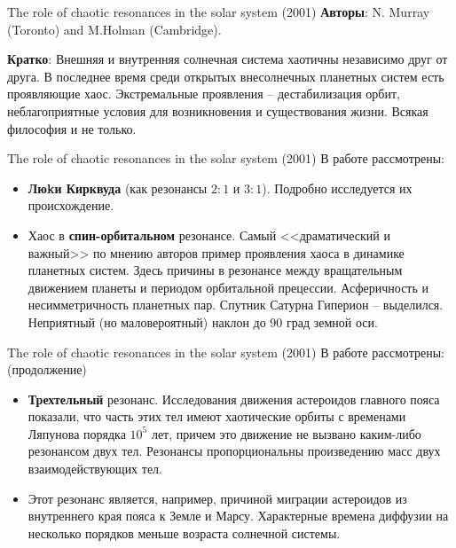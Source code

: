 \documentclass{beamer}
\begin{document}
\begin{frame}{The role of chaotic resonances in the solar system (2001)}
        \textbf{Авторы}: N. Murray (Toronto) and M.Holman (Cambridge).

        \textbf{Кратко}: Внешняя и внутренняя солнечная система хаотичны независимо друг от друга. В последнее время среди открытых внесолнечных планетных систем есть проявляющие хаос. Экстремальные проявления -- дестабилизация орбит, неблагоприятные условия для возникновения и существования жизни. Всякая философия и не только.
\end{frame}


\begin{frame}{The role of chaotic resonances in the solar system (2001)}
        В работе рассмотрены:
        \begin{itemize}
                \item \textbf{Люkи Кирквуда} (как резонансы $2:1$ и $3:1$). Подробно исследуется их происхождение.
                        \item Хаос в \textbf{спин-орбитальном} резонансе. Самый <<драматический и важный>> по мнению авторов пример проявления хаоса в динамике планетных систем. Здесь причины в резонансе между вращательным движением планеты и периодом орбитальной прецессии. Асферичность и несимметричность планетных пар. Спутник Сатурна Гиперион -- выделился. Неприятный (но маловероятный) наклон до 90 град земной оси.
        \end{itemize}
\end{frame}

\begin{frame}{The role of chaotic resonances in the solar system (2001)}
        В работе рассмотрены: (продолжение)
        \begin{itemize}
                \item \textbf{Трехтельный} резонанс. Исследования движения астероидов главного пояса показали, что часть этих тел имеют хаотические орбиты с временами Ляпунова порядка $10^5$ лет, причем это движение не вызвано каким-либо резонансом двух тел. Резонансы пропорциональны произведению масс двух взаимодействующих тел.
                \item Этот резонанс является, например, причиной миграции астероидов из внутреннего края пояса к Земле и Марсу. Характерные времена диффузии на несколько порядков меньше возраста солнечной системы.
        \end{itemize}
\end{frame}
\end{document}
